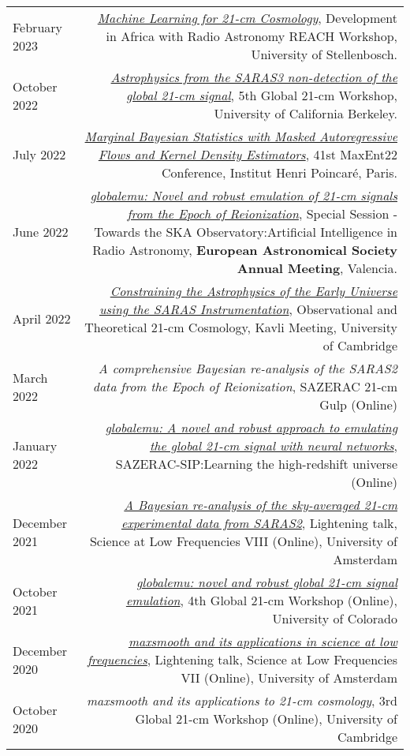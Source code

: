 \documentclass{article}
\begin{document}
\begin{tabular}{L!{\vrule}R}
    February 2023 & \href{https://github.com/htjb/Talks/blob/master/Talks/DARA_REACH_Workshop/DARA_Workshop.pdf}{\textit{Machine Learning for 21-cm Cosmology}}, Development in Africa with Radio Astronomy REACH Workshop, University of Stellenbosch. \\
    October 2022 & \href{https://global21cmworkshop.org/2022-berkeley/}{\textit{Astrophysics from the SARAS3 non-detection of the global 21-cm signal}}, 5th Global 21-cm Workshop, University of California Berkeley. \\
	July 2022 & \href{https://github.com/htjb/Talks/blob/master/Talks/MaxEnt22_margarine_June_2022/MaxEnt_slides.pdf}{\textit{Marginal Bayesian Statistics with Masked Autoregressive Flows and Kernel Density Estimators}}, 41st MaxEnt22 Conference, Institut Henri Poincar\'e, Paris. \\
	June 2022 & \href{https://github.com/htjb/Talks/blob/master/Talks/ESA_globalemu_July_2022/AUDITORIUM\%203A_SS23a_0940_Bevins.pdf}{\textit{globalemu: Novel and robust emulation of 21-cm signals from the Epoch of Reionization}}, Special Session - Towards the SKA Observatory:Artificial Intelligence in Radio Astronomy, \textbf{European Astronomical Society Annual Meeting}, Valencia. \\
	April 2022 & \href{https://www.kicc.cam.ac.uk/events/kavli-science-themed-meetings/observational-and-theoretical-21-cm-cosmology}{\textit{Constraining the Astrophysics of the Early Universe using the SARAS Instrumentation}}, Observational and Theoretical 21-cm Cosmology, Kavli Meeting, University of Cambridge \\
	March 2022 & \textit{A comprehensive Bayesian re-analysis of the SARAS2 data from the Epoch of Reionization}, SAZERAC 21-cm Gulp (Online) \\
	January 2022 & \href{https://www.youtube.com/watch?v=BFwia93NuAc&list=PLp95u5tgS_YUkFaLATBQpLajJzO5ljN5u&index=5}{\textit{globalemu: A novel and robust approach to emulating the global 21-cm signal with neural networks}}, SAZERAC-SIP:Learning the high-redshift universe (Online) \\
	December 2021 & \href{https://www.youtube.com/watch?v=93KCp7rHcGA&list=PLZL7YmXBBHPDCyNfJcWwP78GgacY_Og4E&index=23}{\textit{A Bayesian re-analysis of the sky-averaged 21-cm experimental data from SARAS2}}, Lightening talk, Science at Low Frequencies VIII (Online), University of Amsterdam \\
	October 2021 & \href{https://www.youtube.com/watch?v=862NuVyF33k&list=PLF7c7ri2hrnGlwbn4JLc0PWbncSeARdTP&index=4}{\textit{globalemu: novel and robust global 21-cm signal emulation}}, 4th Global 21-cm Workshop (Online), University of Colorado \\
	December 2020 & \href{https://www.youtube.com/watch?v=Yw6_IInwTNE}{\textit{maxsmooth and its applications in science at low frequencies}}, Lightening talk, Science at Low Frequencies VII (Online), University of Amsterdam \\
	October 2020 & \textit{maxsmooth and its applications to 21-cm cosmology}, 3rd Global 21-cm Workshop (Online), University of Cambridge \\
\end{tabular}
\end{document}
